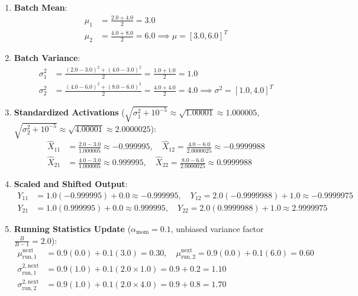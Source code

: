\documentclass[11pt,a4paper]{article}
\theoremstyle{definition}
\begin{document}
\begin{enumerate}
    \item \textbf{Batch Mean}:
    \begin{align}
    \mu_1 &= \frac{2.0 + 4.0}{2} = 3.0 \\
    \mu_2 &= \frac{4.0 + 8.0}{2} = 6.0 \implies \mu = [3.0, 6.0]^T
    \end{align}
    \item \textbf{Batch Variance}:
    \begin{align}
    \sigma_1^2 &= \frac{(2.0 - 3.0)^2 + (4.0 - 3.0)^2}{2} = \frac{1.0 + 1.0}{2} = 1.0 \\
    \sigma_2^2 &= \frac{(4.0 - 6.0)^2 + (8.0 - 6.0)^2}{2} = \frac{4.0 + 4.0}{2} = 4.0 \implies \sigma^2 = [1.0, 4.0]^T
    \end{align}
    \item \textbf{Standardized Activations} ($\sqrt{\sigma_1^2 + 10^{-5}} \approx \sqrt{1.00001} \approx 1.000005$, $\sqrt{\sigma_2^2 + 10^{-5}} \approx \sqrt{4.00001} \approx 2.0000025$):
    \begin{align}
    \hat{X}_{11} &= \frac{2.0 - 3.0}{1.000005} \approx -0.999995, \quad \hat{X}_{12} = \frac{4.0 - 6.0}{2.0000025} \approx -0.9999988 \\
    \hat{X}_{21} &= \frac{4.0 - 3.0}{1.000005} \approx 0.999995, \quad \hat{X}_{22} = \frac{8.0 - 6.0}{2.0000025} \approx 0.9999988
    \end{align}
    \item \textbf{Scaled and Shifted Output}:
    \begin{align}
    Y_{11} &= 1.0(-0.999995) + 0.0 \approx -0.999995, \quad Y_{12} = 2.0(-0.9999988) + 1.0 \approx -0.9999975 \\
    Y_{21} &= 1.0(0.999995) + 0.0 \approx 0.999995, \quad Y_{22} = 2.0(0.9999988) + 1.0 \approx 2.9999975
    \end{align}
    \item \textbf{Running Statistics Update} ($\alpha_{\text{mom}} = 0.1$, unbiased variance factor $\frac{B}{B-1} = 2.0$):
    \begin{align}
    \mu_{\text{run}, 1}^{\text{next}} &= 0.9(0.0) + 0.1(3.0) = 0.30, \quad \mu_{\text{run}, 2}^{\text{next}} = 0.9(0.0) + 0.1(6.0) = 0.60 \\
    \sigma_{\text{run}, 1}^{2, \text{next}} &= 0.9(1.0) + 0.1(2.0 \times 1.0) = 0.9 + 0.2 = 1.10 \\
    \sigma_{\text{run}, 2}^{2, \text{next}} &= 0.9(1.0) + 0.1(2.0 \times 4.0) = 0.9 + 0.8 = 1.70
    \end{align}
\end{enumerate}
\end{document}
